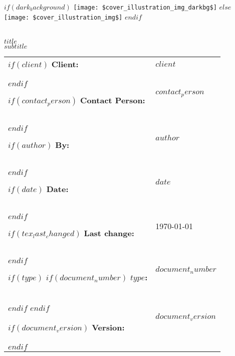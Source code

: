 \begin{titlepage}

\vspace*{-3cm}

\begin{center}
  $if(dark_background)$
    \texttt{[image: \$cover\_illustration\_img\_darkbg\$]}
  $else$
    \texttt{[image: \$cover\_illustration\_img\$]}
  $endif$
\end{center}

\begin{spacing}{2.0}

\noindent
\\
{\huge {\MakeUppercase{$title$}}}\\
{\Large {$subtitle$}}\\
\end{spacing}


\setlength\extrarowheight{3pt}
\begin{flushleft}
\noindent\begin{tabular}{@{}l l }

$if(client)$
{\bf Client:} & $client$ \\
$endif$

$if(contact_person)$
  {\bf Contact Person:} & $contact_person$ \\
$endif$

$if(author)$
{\bf By: } & $author$ \\
$endif$

$if(date)$
{\bf Date: } & $date$ \\
$endif$

$if(tex_last_changed)$
{\bf Last change:} & \today \\
$endif$

$if(type)$
  $if(document_number)$
  {\bf $type$:} & $document_number$ \\
  $endif$
$endif$

$if(document_version)$
{\bf Version:} & $document_version$ \\
$endif$

\end{tabular}
\end{flushleft}

\end{titlepage}


